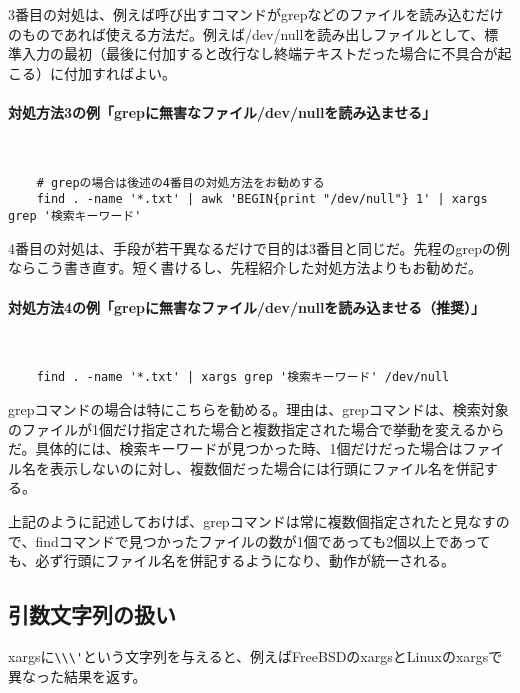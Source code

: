 3番目の対処は、例えば呼び出すコマンドがgrepなどのファイルを読み込むだけのものであれば使える方法だ。例えば/dev/nullを読み出しファイルとして、標準入力の最初（最後に付加すると改行なし終端テキストだった場合に不具合が起こる）に付加すればよい。

\paragraph{対処方法3の例「grepに無害なファイル/dev/nullを読み込ませる」} 　\\
\begin{frameboxit}{160.0mm}
\begin{verbatim}
	# grepの場合は後述の4番目の対処方法をお勧めする
	find . -name '*.txt' | awk 'BEGIN{print "/dev/null"} 1' | xargs grep '検索キーワード'
\end{verbatim}
\end{frameboxit}

4番目の対処は、手段が若干異なるだけで目的は3番目と同じだ。先程のgrepの例ならこう書き直す。短く書けるし、先程紹介した対処方法よりもお勧めだ。

\paragraph{対処方法4の例「grepに無害なファイル/dev/nullを読み込ませる（推奨）」} 　\\
\begin{frameboxit}{160.0mm}
\begin{verbatim}
	find . -name '*.txt' | xargs grep '検索キーワード' /dev/null
\end{verbatim}
\end{frameboxit}

grepコマンドの場合は特にこちらを勧める。理由は、grepコマンドは、検索対象のファイルが1個だけ指定された場合と複数指定された場合で挙動を変えるからだ。具体的には、検索キーワードが見つかった時、1個だけだった場合はファイル名を表示しないのに対し、複数個だった場合には行頭にファイル名を併記する。

上記のように記述しておけば、grepコマンドは常に複数個指定されたと見なすので、findコマンドで見つかったファイルの数が1個であっても2個以上であっても、必ず行頭にファイル名を併記するようになり、動作が統一される。

\subsection*{引数文字列の扱い}

xargsに\verb|\\\'|という文字列を与えると、例えばFreeBSDのxargsとLinuxのxargsで異なった結果を返す。


